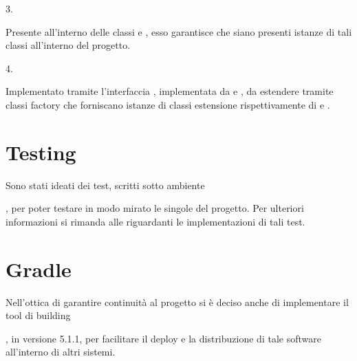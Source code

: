 \documentclass[letterpaper,10pt,italian]{sphinxmanual}
\begin{document}
3.  %
\begin{footnote}[4]\sphinxAtStartFootnote
{}
%
\end{footnote}
Presente all’interno delle classi  e , esso garantisce che siano presenti  istanze di tali classi all’interno del progetto.

4.  %
\begin{footnote}[5]\sphinxAtStartFootnote
{}
%
\end{footnote}
Implementato tramite l’interfaccia , implementata da  e ,  da estendere tramite classi factory che forniscano istanze di classi estensione rispettivamente di  e .


\section{Testing}
\label{\detokenize{introduzione:testing}}
Sono stati ideati dei test, scritti sotto ambiente  %
\begin{footnote}[6]\sphinxAtStartFootnote
{}
%
\end{footnote}, per poter testare in modo mirato le singole  del progetto.
Per ulteriori informazioni si rimanda alle {\hyperref[\detokenize{test/packages::doc}]{}}  riguardanti le implementazioni di tali test.


\section{Gradle}
\label{\detokenize{introduzione:gradle}}
Nell’ottica di garantire continuità al progetto si è deciso anche di implementare il tool di building  %
\begin{footnote}[7]\sphinxAtStartFootnote
{}
%
\end{footnote}, in versione 5.1.1,
per facilitare il deploy e la distribuzione di tale software all’interno di altri sistemi.
\end{document}
